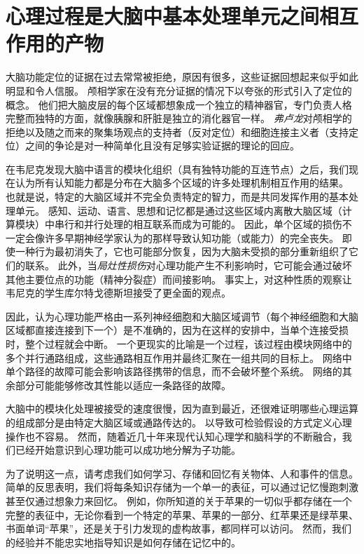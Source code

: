 \section{心理过程是大脑中基本处理单元之间相互作用的产物}

大脑功能定位的证据在过去常常被拒绝，原因有很多，这些证据回想起来似乎如此明显和令人信服。
颅相学家在没有充分证据的情况下以夸张的形式引入了定位的概念。
他们把大脑皮层的每个区域都想象成一个独立的精神器官，专门负责人格完整而独特的方面，就像胰腺和肝脏是独立的消化器官一样。
\textit{弗卢龙}对颅相学的拒绝以及随之而来的聚集场观点的支持者（反对定位）和细胞连接主义者（支持定位）之间的争论是对一种简单化且没有足够实验证据的理论的回应。


在韦尼克发现大脑中语言的模块化组织（具有独特功能的互连节点）之后，我们现在认为所有认知能力都是分布在大脑多个区域的许多处理机制相互作用的结果。
也就是说，特定的大脑区域并不完全负责特定的智力，而是共同发挥作用的基本处理单元。
感知、运动、语言、思想和记忆都是通过这些区域内离散大脑区域（计算模块）中串行和并行处理的相互联系而成为可能的。
因此，单个区域的损伤不一定会像许多早期神经学家认为的那样导致认知功能（或能力）的完全丧失。
即使一种行为最初消失了，它也可能部分恢复，因为大脑未受损的部分重新组织了它们的联系。
此外，当\textit{局灶性损伤}对心理功能产生不利影响时，它可能会通过破坏其他主要位点的功能（精神分裂症）而间接影响。
事实上，对这种性质的观察让韦尼克的学生库尔特戈德斯坦接受了更全面的观点。


因此，认为心理功能严格由一系列神经细胞和大脑区域调节（每个神经细胞和大脑区域都直接连接到下一个）是不准确的，因为在这样的安排中，当单个连接受损时，整个过程就会中断。
一个更现实的比喻是一个过程，该过程由模块网络中的多个并行通路组成，这些通路相互作用并最终汇聚在一组共同的目标上。
网络中单个路径的故障可能会影响该路径携带的信息，而不会破坏整个系统。
网络的其余部分可能能够修改其性能以适应一条路径的故障。


大脑中的模块化处理被接受的速度很慢，因为直到最近，还很难证明哪些心理运算的组成部分是由特定大脑区域或通路传达的。
以导致可检验假设的方式定义心理操作也不容易。
然而，随着近几十年来现代认知心理学和脑科学的不断融合，我们已经开始意识到心理功能可以成功地分解为子功能。


为了说明这一点，请考虑我们如何学习、存储和回忆有关物体、人和事件的信息。
简单的反思表明，我们将每条知识存储为一个单一的表征，可以通过记忆慢跑刺激甚至仅通过想象力来回忆。
例如，你所知道的关于苹果的一切似乎都存储在一个完整的表征中，无论你看到一个特定的苹果、苹果的一部分、红苹果还是绿苹果、书面单词“苹果”，还是关于引力发现的虚构故事，都同样可以访问。
然而，我们的经验并不能忠实地指导知识是如何存储在记忆中的。


